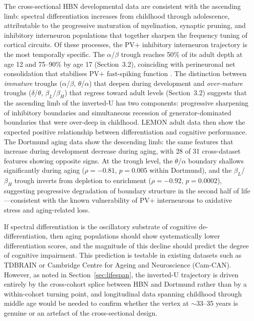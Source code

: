 The cross-sectional HBN developmental data are consistent with the ascending limb: spectral differentiation increases from childhood through adolescence, attributable to the progressive maturation of myelination, synaptic pruning, and inhibitory interneuron populations that together sharpen the frequency tuning of cortical circuits. Of these processes, the PV+ inhibitory interneuron trajectory is the most temporally specific. The $\alpha$/$\beta$ trough reaches 50\% of its adult depth at age 12 and 75--90\% by age 17 (Section~3.2), coinciding with perineuronal net consolidation that stabilises PV+ fast-spiking function \parencite{hensch2005critical}. The distinction between \emph{immature} troughs ($\alpha$/$\beta$, $\theta$/$\alpha$) that deepen during development and \emph{over-mature} troughs ($\delta$/$\theta$, $\beta_L$/$\beta_H$) that regress toward adult levels (Section~3.2) suggests that the ascending limb of the inverted-U has two components: progressive sharpening of inhibitory boundaries and simultaneous recession of generator-dominated boundaries that were over-deep in childhood. LEMON adult data then show the expected positive relationship between differentiation and cognitive performance. The Dortmund aging data show the descending limb: the same features that increase during development decrease during aging, with 28 of 31 cross-dataset features showing opposite signs. At the trough level, the $\theta$/$\alpha$ boundary shallows significantly during aging ($\rho = -0.81$, $p = 0.005$ within Dortmund), and the $\beta_L$/$\beta_H$ trough inverts from depletion to enrichment ($\rho = -0.92$, $p = 0.0002$), suggesting progressive degradation of boundary structure in the second half of life---consistent with the known vulnerability of PV+ interneurons to oxidative stress and aging-related loss.

If spectral differentiation is the oscillatory substrate of cognitive de-differentiation, then aging populations should show systematically lower differentiation scores, and the magnitude of this decline should predict the degree of cognitive impairment. This prediction is testable in existing datasets such as TDBRAIN or Cambridge Centre for Ageing and Neuroscience (Cam-CAN). However, as noted in Section~\ref{sec:lifespan}, the inverted-U trajectory is driven entirely by the cross-cohort splice between HBN and Dortmund rather than by a within-cohort turning point, and longitudinal data spanning childhood through middle age would be needed to confirm whether the vertex at $\sim$33--35 years is genuine or an artefact of the cross-sectional design.

